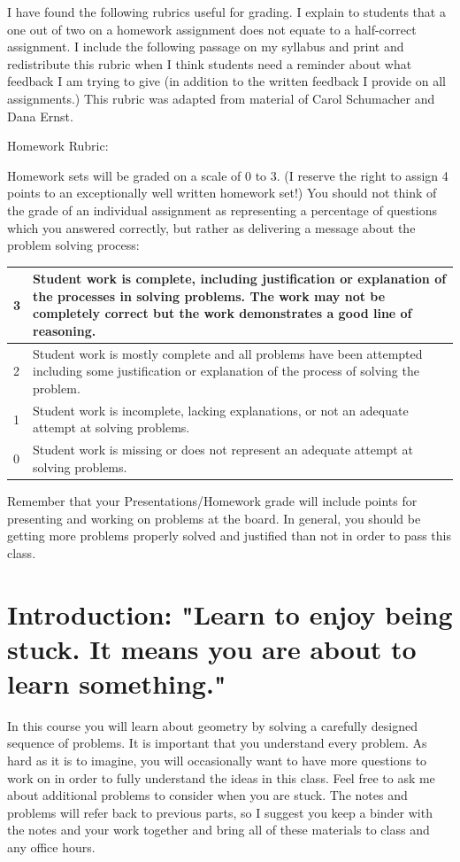 \begin{annotation}
I have found the following rubrics useful for grading.  I explain to students that a one out of two on a homework assignment does not equate to a half-correct assignment. I include the following passage on my syllabus and print and redistribute this rubric when I think students need a reminder about what feedback I am trying to give (in addition to the written feedback I provide on all assignments.) This rubric was adapted from material of Carol Schumacher and Dana Ernst.

Homework Rubric:

Homework sets will be graded on a scale of 0 to 3. (I reserve the right to assign 4 points to an exceptionally well written homework set!) You should not think of the grade of an individual assignment as representing a percentage of questions which you answered correctly, but rather as delivering a message about the problem solving process:
\newline
\begin{tabular}{|l|p{11cm}|}
\hline
3 & Student work is complete, including justification or explanation of the processes in solving problems. The work may not be completely correct but the work demonstrates a good line of reasoning. \\
\hline
2 & Student work is mostly complete and all problems have been attempted including some justification or explanation of the process of solving the problem.\\
\hline
1 & Student work is incomplete, lacking explanations, or not an adequate attempt at solving problems. \\
\hline
0 & Student work is missing or does not represent an adequate attempt at solving problems. \\
\hline
\end{tabular}

Remember that your Presentations/Homework grade will include points for presenting and working on problems at the board. In general, you should be getting more problems properly solved and justified than not in order to pass this class.

\end{annotation}
\chapter{Introduction: "Learn to enjoy being stuck. It means you are about to learn something."}


In this course you will learn about geometry by solving a carefully designed sequence of problems.  It is important that you understand every problem. As hard as it is to imagine, you will occasionally want to have more questions to work on in order to fully understand the ideas in this class. Feel free to ask me about additional problems to consider when you are stuck. The notes and problems will refer back to previous parts, so I suggest you keep a binder with the notes and your work together and bring all of these materials to class and any office hours.

